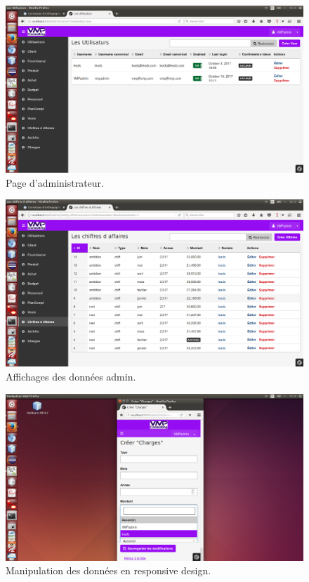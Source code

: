 \documentclass[12pt]{article}
\begin{document}
\begin{figure}[htp]
  \centering
  \includegraphics[width=12cm]{t7.png}
  \caption{Page d'administrateur.}
  \label{fig:une-autre-image}
\end{figure}

\begin{figure}[htp]
  \centering
  \includegraphics[width=12cm]{t8.png}
  \caption{Affichages des données admin.}
  \label{fig:une-autre-image}
\end{figure}

\begin{figure}[htp]
  \centering
  \includegraphics[width=12cm]{t10.png}
  \caption{Manipulation des données en responsive design.}
  \label{fig:une-autre-image}
\end{figure}
\end{document}
